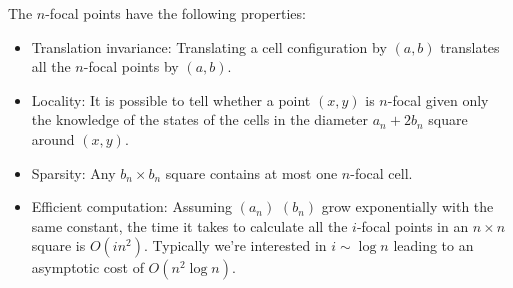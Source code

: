 \documentclass{article}
\theoremstyle{definition}
\begin{document}
The $n$-focal points have the following properties:

\begin{itemize}
\item Translation invariance: Translating a cell configuration by $(a, b)$
translates all the $n$-focal points by $(a, b)$.

\item Locality: It is possible to tell whether a point $(x, y)$ is $n$-focal
given only the knowledge of the states of the cells in the diameter $a_n + 2
b_n$ square around $(x, y)$.

\item Sparsity: Any $b_n \times b_n$ square contains at most one $n$-focal cell.

\item Efficient computation: Assuming $(a_n)$ $(b_n)$ grow exponentially with
the same constant, the time it takes to calculate all the $i$-focal points in an
$n \times n$ square is $O (i n^2)$. Typically we're interested in $i \sim \log
n$ leading to an asymptotic cost of $O (n^2 \log n)$.
\end{itemize}
\end{document}
